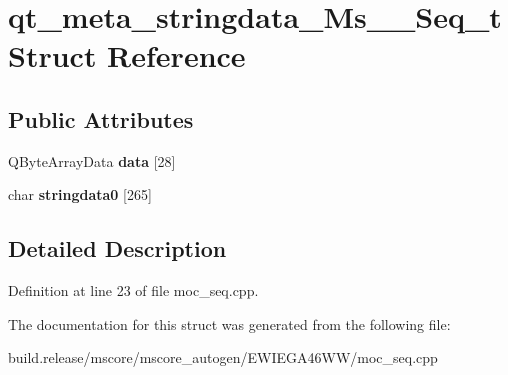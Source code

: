 \hypertarget{structqt__meta__stringdata___ms_____seq__t}{}\section{qt\+\_\+meta\+\_\+stringdata\+\_\+\+Ms\+\_\+\+\_\+\+Seq\+\_\+t Struct Reference}
\label{structqt__meta__stringdata___ms_____seq__t}
\subsection*{Public Attributes}
\begin{DoxyCompactItemize}
\item 
\mbox{\label{structqt__meta__stringdata___ms_____seq__t_ac7234f69dd5e15aeaf9a7a5bc118201e}} 
Q\+Byte\+Array\+Data {\bfseries data} \mbox{[}28\mbox{]}
\item 
\mbox{\label{structqt__meta__stringdata___ms_____seq__t_a30d79953bf6e603423520a85a2e5a1ac}} 
char {\bfseries stringdata0} \mbox{[}265\mbox{]}
\end{DoxyCompactItemize}


\subsection{Detailed Description}


Definition at line 23 of file moc\+\_\+seq.\+cpp.



The documentation for this struct was generated from the following file\+:\begin{DoxyCompactItemize}
\item 
build.\+release/mscore/mscore\+\_\+autogen/\+E\+W\+I\+E\+G\+A46\+W\+W/moc\+\_\+seq.\+cpp\end{DoxyCompactItemize}
